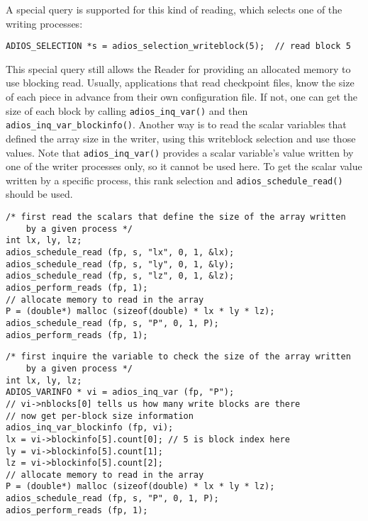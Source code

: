  A special query is supported for this kind of reading, which selects one of the writing processes:

\begin{lstlisting}[frame=none]
ADIOS_SELECTION *s = adios_selection_writeblock(5);  // read block 5 
\end{lstlisting}
 
This special query still allows the Reader for providing an allocated memory to use blocking read. Usually, applications that read checkpoint files, know the size of each piece in advance from their own configuration file. If not, one can get the size of each block by calling \verb+adios_inq_var()+ and then \verb+adios_inq_var_blockinfo()+. Another way is to read the scalar variables that defined the array size in the writer, using this writeblock selection and use those values. Note that \verb+adios_inq_var()+ provides a scalar variable's value written by one of the writer processes only, so it cannot be used here. To get the scalar value written by a specific process, this rank selection and \verb+adios_schedule_read()+ should be used.

\begin{lstlisting}[numbers=none, 
                   caption={Read an array written by one specific process, with first reading the scalars that define the size of the array},  
                   label=code:localread]
/* first read the scalars that define the size of the array written
    by a given process */
int lx, ly, lz;
adios_schedule_read (fp, s, "lx", 0, 1, &lx);
adios_schedule_read (fp, s, "ly", 0, 1, &ly);
adios_schedule_read (fp, s, "lz", 0, 1, &lz);
adios_perform_reads (fp, 1); 
// allocate memory to read in the array
P = (double*) malloc (sizeof(double) * lx * ly * lz);
adios_schedule_read (fp, s, "P", 0, 1, P);
adios_perform_reads (fp, 1);  
\end{lstlisting}


\begin{lstlisting}[numbers=none, 
                   frame=T,
                   caption={Read an array written by one specific process, with first checking the size},  
                   label=code:localread2]
/* first inquire the variable to check the size of the array written
    by a given process */
int lx, ly, lz;
ADIOS_VARINFO * vi = adios_inq_var (fp, "P");
// vi->nblocks[0] tells us how many write blocks are there
// now get per-block size information
adios_inq_var_blockinfo (fp, vi);
lx = vi->blockinfo[5].count[0]; // 5 is block index here
ly = vi->blockinfo[5].count[1];
lz = vi->blockinfo[5].count[2];
// allocate memory to read in the array
P = (double*) malloc (sizeof(double) * lx * ly * lz);
adios_schedule_read (fp, s, "P", 0, 1, P);
adios_perform_reads (fp, 1);  
\end{lstlisting}

